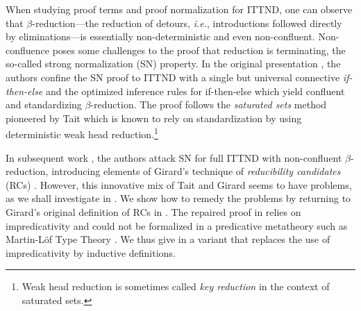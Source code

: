 \documentclass[a4paper,USenglish,cleveref, autoref, thm-restate]{lipics-v2019}
\newcommand{\ie}{\emph{i.e.}\xspace}
\begin{document}
When studying proof terms and proof normalization for ITTND, one can
observe that $\beta$-reduction---the reduction of detours, \ie, introductions followed
directly by eliminations\footnotemark---is essentially non-deterministic and even
non-confluent.
%
Non-confluence poses some challenges to the proof that reduction is
terminating, the so-called strong normalization (SN) property.  In the
original presentation \cite{geuversHurkens:icla17}, the authors
confine the SN proof to ITTND with a single but universal
connective \emph{if-then-else} and the optimized inference rules for
if-then-else which yield confluent and standardizing $\beta$-reduction.  The proof
follows the \emph{saturated sets} method pioneered by Tait
\cite{tait:functionalsFiniteTypeI} which is known to rely on
standardization by using deterministic weak head
reduction.\footnote{Weak head reduction is sometimes called \emph{key
  reduction} in the context of saturated sets.}

In subsequent work \cite{geuversHurkens:types17}, the authors attack
SN for full ITTND with non-confluent $\beta$-reduction, introducing
elements of Girard's technique of \emph{reducibility candidates} (RCs)
\cite{girard:thesis,girardLafontTaylor:proofsAndTypes}.  However, this
innovative mix of Tait and Girard seems to have problems, as we shall
investigate in .  We show how to remedy the problems by
returning to Girard's original definition of RCs in .
The repaired proof in  relies on impredicativity
and could not be formalized in a predicative metatheory such as
Martin-Löf Type Theory \cite{MartinLoef84}.  We thus give in
 a variant that
replaces the use of impredicativity by inductive definitions.
\end{document}

